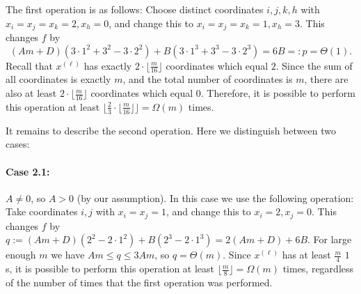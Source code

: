 \documentclass[11pt]{article}
\let\oldendproof\endproof
\renewenvironment{proof}[1][\proofname]{%
	\oldproof[\bf #1]%
}{\oldendproof}
\theoremstyle{plain}
\begin{document}
\begin{proof}[Proof of Lemma \ref{general-values-lemma}]
    The first operation is as follows: Choose distinct coordinates $i,j,k,h$ with $x_i = x_j = x_k = 2, x_h = 0$, and change this to $x_i = x_j = x_k = 1, x_h = 3$. This changes $f$ by 
    $$(Am+D)(3 \cdot 1^2 + 3^2 - 3 \cdot 2^2) + B(3 \cdot 1^3 + 3^3 - 3 \cdot 2^3) = 6B =: p = \Theta(1).$$ 
    Recall that $x^{(\ell)}$ has exactly $2 \cdot \lfloor \frac{m}{16} \rfloor$ coordinates which equal $2$. Since the sum of all coordinates is exactly $m$, and the total number of coordinates is $m$, there are also at least $2 \cdot \lfloor \frac{m}{16} \rfloor$ coordinates which equal $0$. 
    Therefore, it is possible to perform this operation at least 
    $\lfloor \frac{2}{3} \cdot \lfloor \frac{m}{16} \rfloor \rfloor = \Omega(m)$ times. 
    
    It remains to describe the second operation. Here we distinguish between two cases: 
    \paragraph{Case 2.1:} $A \neq 0$, so $A > 0$ (by our assumption). In this case we use the following operation: 
    Take coordinates $i,j$ with $x_i = x_j = 1$, and change this to $x_i = 2, x_j = 0$. This changes $f$ by 
    $
    q := (Am+D)(2^2 - 2 \cdot 1^2) + B(2^3 - 2 \cdot 1^3) = 2(Am+D) + 6B.
    $
    For large enough $m$ we have $Am \leq q \leq 3Am$, so $q = \Theta(m)$. 
    Since $x^{(\ell)}$ has at least $\frac{m}{4}$ $1$s, it is possible to perform this operation at least $\lfloor \frac{m}{8} \rfloor = \Omega(m)$ times, regardless of the number of times that the first operation was performed. 
    

\end{proof}
\end{document}
